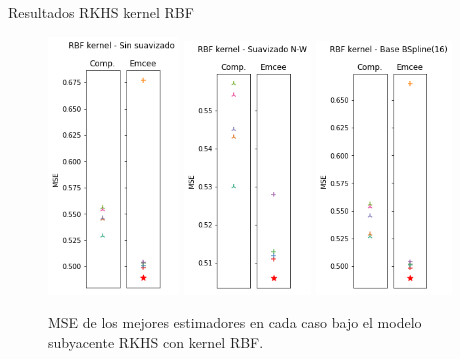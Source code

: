 \documentclass[10pt, professionalfonts]{beamer}
\begin{document}
\begin{frame}{Resultados RKHS kernel RBF}
  \begin{figure}
    \includegraphics[width=0.31\textwidth]{img/results-new/reg_rkhs_rbf_none}\hfill
    \includegraphics[width=0.3\textwidth]{img/results-new/reg_rkhs_rbf_nw}\hfill
    \includegraphics[width=0.32\textwidth]{img/results-new/reg_rkhs_rbf_basis}
    \caption{MSE de los mejores estimadores en cada caso bajo el modelo subyacente RKHS con kernel RBF.}
  \end{figure}
\end{frame}
\end{document}
